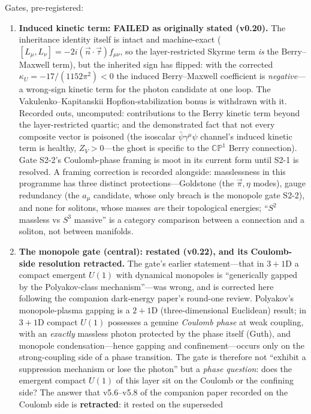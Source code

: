 \documentclass[11pt,a4paper]{article}
\begin{document}
Gates, pre-registered:
\begin{enumerate}
\item[S2-1.] \textbf{Induced kinetic term: FAILED as originally
stated (v0.20).}  The inheritance identity itself is intact and
machine-exact ($[L_\mu,L_\nu] = -2i(\vec n\cdot\vec\tau)
f_{\mu\nu}$, so the layer-restricted Skyrme term \emph{is} the
Berry--Maxwell term), but the inherited sign has flipped: with
the corrected $\kappa_U = -17/(1152\pi^2) < 0$ the induced
Berry--Maxwell coefficient is \emph{negative}---a wrong-sign
kinetic term for the photon candidate at one loop.  The
Vakulenko--Kapitanskii Hopfion-stabilization bonus is withdrawn
with it.  Recorded outs, uncomputed: contributions to the Berry
kinetic term beyond the layer-restricted quartic; and the
demonstrated fact that not every composite vector is poisoned
(the isoscalar $\bar\psi\gamma^\mu\psi$ channel's induced
kinetic term is healthy, $Z_V > 0$---the ghost is specific to
the $\mathbb{CP}^1$ Berry connection).  Gate S2-2's
Coulomb-phase framing is moot in its current form until S2-1 is
resolved.
A framing correction is recorded alongside: masslessness in this
programme has three distinct protections---Goldstone (the
$\vec\pi,\eta$ modes), gauge redundancy (the $a_\mu$
candidate, whose only breach is the monopole gate S2-2), and
none for solitons, whose masses \emph{are} their topological
energies; ``$S^2$ massless vs $S^3$ massive'' is a category
comparison between a connection and a soliton, not between
manifolds.
\item[S2-2.] \textbf{The monopole gate (central): restated
(v0.22), and its Coulomb-side resolution retracted.}
The gate's earlier statement---that in $3{+}1$D a compact
emergent $U(1)$ with dynamical monopoles is ``generically gapped
by the Polyakov-class mechanism''---was wrong, and is corrected
here following the companion dark-energy paper's round-one
review.  Polyakov's monopole-plasma gapping is a $2{+}1$D
(three-dimensional Euclidean) result; in $3{+}1$D compact $U(1)$
possesses a genuine \emph{Coulomb phase} at weak coupling, with
an \emph{exactly} massless photon protected by the phase itself
(Guth), and monopole condensation---hence gapping and
confinement---occurs only on the strong-coupling side of a phase
transition.  The gate is therefore not ``exhibit a suppression
mechanism or lose the photon'' but a \emph{phase question}: does
the emergent compact $U(1)$ of this layer sit on the Coulomb or
the confining side?
The answer that v5.6--v5.8 of the companion paper recorded on the
Coulomb side is \textbf{retracted}: it rested on the superseded

\end{enumerate}
\end{document}
